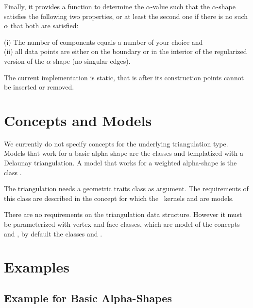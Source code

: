 Finally, it provides a function to determine the $\alpha$-value
such that the $\alpha$-shape  satisfies the following two properties,
or at least the second one if there is no such $\alpha$ that both
are satisfied:

(i) The number of components equals a number of your choice and\\
(ii) all data points are either on the boundary or in the interior of the regularized version of 
the $\alpha$-shape (no singular edges).

\smallskip
The current implementation is static, that is after its construction
points cannot be inserted or removed.

\section{Concepts and Models\label{I1_SectDtClass2D}}


We currently do not specify concepts for the underlying triangulation
type. Models that work for a basic alpha-shape are the classes
 and 
 templatized with a Delaunay
triangulation. A model that works for a weighted alpha-shape is 
the class .

The triangulation needs a geometric traits class as argument.
The requirements of this class are described in the 
concept  for which
the \cgal\ kernels
and  are models.

There are no requirements on the triangulation data structure.
However it must be parameterized with 
vertex and face classes, which are model of the concepts
 and ,
by default the classes  
and .





\section{Examples}
\subsection{Example for Basic Alpha-Shapes\label{I1_SectClassicAS2D}}

